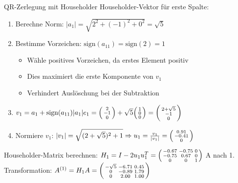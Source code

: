 \begin{example2}[breakable]{QR-Zerlegung mit Householder}
Householder-Vektor für erste Spalte:
\vspace{1mm}
\begin{enumerate}
    \item Berechne Norm: $|a_1| = \sqrt{2^2 + (-1)^2 + 0^2} = \sqrt{5}$
    \vspace{1mm}
    \item Bestimme Vorzeichen: $\text{sign}(a_{11}) = \text{sign}(2) = 1$
         \begin{itemize}
              \item Wähle positives Vorzeichen, da erstes Element positiv
              \item Dies maximiert die erste Komponente von $v_1$
              \item Verhindert Auslöschung bei der Subtraktion
         \end{itemize}
         \vspace{1mm}
    \item $v_1 = a_1 + \text{sign}(a_{11})|a_1|e_1 = \begin{psmallmatrix} 2\\ -1\\ 0 \end{psmallmatrix} + \sqrt{5}\begin{psmallmatrix} 1\\ 0\\ 0 \end{psmallmatrix} = \begin{psmallmatrix} 2 + \sqrt{5}\\ -1\\ 0 \end{psmallmatrix}$
    \vspace{1mm}
    \item Normiere $v_1$: $|v_1| = \sqrt{(2 + \sqrt{5})^2 + 1} \Rightarrow
            u_1 = \frac{v_1}{|v_1|} = \begin{psmallmatrix} 0.91\\ -0.41\\ 0 \end{psmallmatrix}$
\end{enumerate}
\vspace{1mm}
Householder-Matrix berechnen:
$H_1 = I - 2u_1u_1^T = \begin{psmallmatrix} 
-0.67 & -0.75 & 0\\
-0.75 & 0.67 & 0\\
0 & 0 & 1
\end{psmallmatrix}$
A nach 1. Transformation:
$A^{(1)} = H_1A = \begin{psmallmatrix}
-\sqrt{5} & -6.71 & 0.45\\
0 & -0.89 & 1.79\\
0 & 2.00 & 1.00
\end{psmallmatrix}$

\end{example2}

